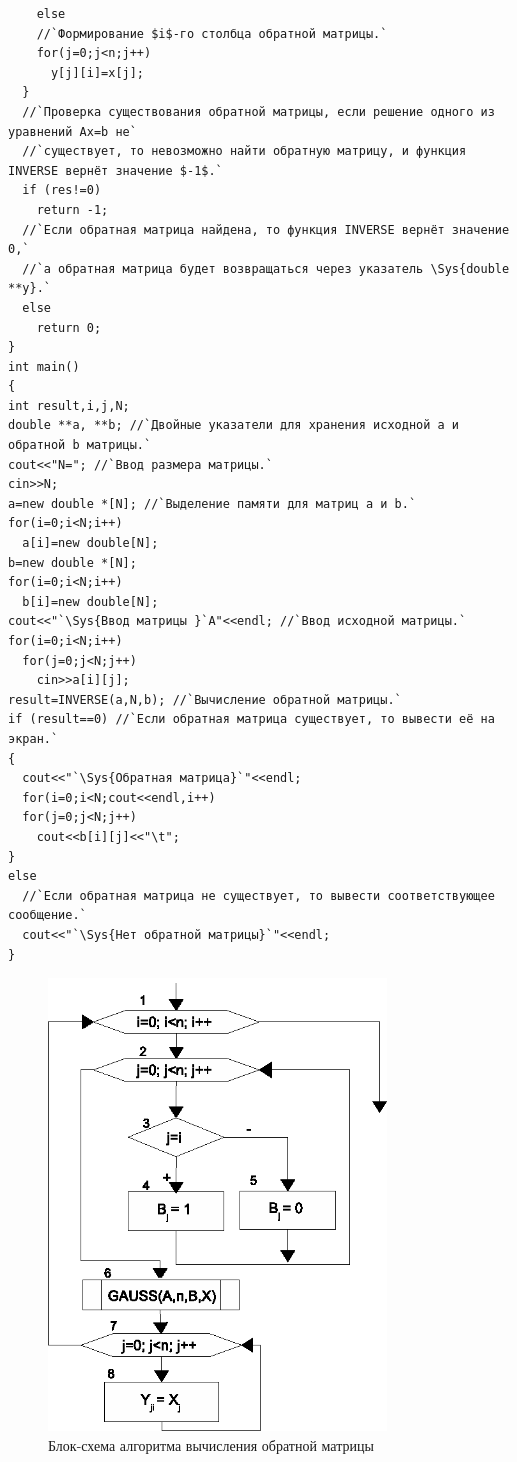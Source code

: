 \begin{lstlisting}
    else
    //`Формирование $i$-го столбца обратной матрицы.`
    for(j=0;j<n;j++)
      y[j][i]=x[j];
  }
  //`Проверка существования обратной матрицы, если решение одного из уравнений Ax=b не`
  //`существует, то невозможно найти обратную матрицу, и функция INVERSE вернёт значение $-1$.`
  if (res!=0)
    return -1;
  //`Если обратная матрица найдена, то функция INVERSE вернёт значение 0,` 
  //`а обратная матрица будет возвращаться через указатель \Sys{double **y}.`
  else
    return 0;
}
int main()
{
int result,i,j,N;
double **a, **b; //`Двойные указатели для хранения исходной a и обратной b матрицы.`
cout<<"N="; //`Ввод размера матрицы.`
cin>>N;
a=new double *[N]; //`Выделение памяти для матриц a и b.`
for(i=0;i<N;i++)
  a[i]=new double[N];
b=new double *[N];
for(i=0;i<N;i++)
  b[i]=new double[N];
cout<<"`\Sys{Ввод матрицы }`A"<<endl; //`Ввод исходной матрицы.`
for(i=0;i<N;i++)
  for(j=0;j<N;j++)
    cin>>a[i][j];
result=INVERSE(a,N,b); //`Вычисление обратной матрицы.`
if (result==0) //`Если обратная матрица существует, то вывести её на экран.`
{
  cout<<"`\Sys{Обратная матрица}`"<<endl;
  for(i=0;i<N;cout<<endl,i++)
  for(j=0;j<N;j++)
    cout<<b[i][j]<<"\t";
}
else
  //`Если обратная матрица не существует, то вывести соответствующее сообщение.`
  cout<<"`\Sys{Нет обратной матрицы}`"<<endl;
}
\end{lstlisting}

\begin{figure}[htb]
\begin{center}
\includegraphics[width=0.8\textwidth]{img/ris_6_16}
\caption{Блок-схема алгоритма вычисления обратной матрицы}
\label{ch06:refDrawing15}
\end{center}
\end{figure}

